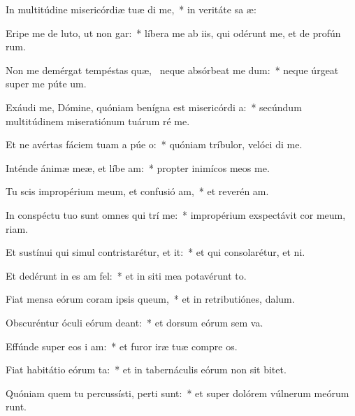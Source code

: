 \item In multitúdine misericórdiæ tuæ di me,~* in veritáte sa æ:
\item Eripe me de luto, ut non gar:~* líbera me ab iis, qui odérunt me, et de profún rum.
\item Non me demérgat tempéstas quæ,~\pscross{} neque absórbeat me dum:~* neque úrgeat super me púte  um.
\item Exáudi me, Dómine, quóniam benígna est misericórdi a:~* secúndum multitúdinem miseratiónum tuárum ré  me.
\item Et ne avértas fáciem tuam a púe o:~* quóniam tríbulor, velóci di me.
\item Inténde ánimæ meæ, et líbe am:~* propter inimícos meos  me.
\item Tu scis impropérium meum, et confusió am,~* et reverén am.
\item In conspéctu tuo sunt omnes qui trí me:~* impropérium exspectávit cor meum,  riam.
\item Et sustínui qui simul contristarétur, et  it:~* et qui consolarétur, et  ni.
\item Et dedérunt in es am fel:~* et in siti mea potavérunt  to.
\item Fiat mensa eórum coram ipsis  queum,~* et in retributiónes,   dalum.
\item Obscuréntur óculi eórum  deant:~* et dorsum eórum sem va.
\item Effúnde super eos i am:~* et furor iræ tuæ compre os.
\item Fiat habitátio eórum ta:~* et in tabernáculis eórum non sit  bitet.
\item Quóniam quem tu percussísti, perti sunt:~* et super dolórem vúlnerum meórum runt.
